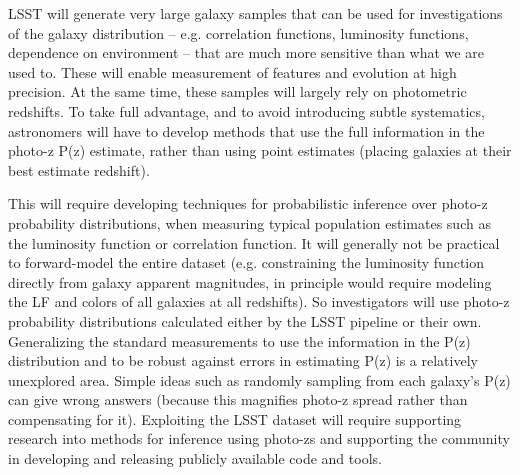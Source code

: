 
LSST will generate very large galaxy samples that can be used for
investigations of the galaxy distribution -- e.g. correlation
functions, luminosity functions, dependence on environment -- that are
much more sensitive than what we are used to. These will enable
measurement of features and evolution at high precision. At the same
time, these samples will largely rely on photometric redshifts. To
take full advantage, and to avoid introducing subtle systematics,
astronomers will have to develop methods that use the full information
in the photo-z P(z) estimate, rather than using point estimates
(placing galaxies at their best estimate redshift).

This will require developing techniques for probabilistic inference
over photo-z probability distributions, when measuring typical
population estimates such as the luminosity function or correlation
function. It will generally not be practical to forward-model the
entire dataset (e.g. constraining the luminosity function directly
from galaxy apparent magnitudes, in principle would require modeling
the LF and colors of all galaxies at all redshifts). So investigators
will use photo-z probability distributions calculated either by the
LSST pipeline or their own.  Generalizing the standard measurements to
use the information in the P(z) distribution and to be robust against
errors in estimating P(z) is a relatively unexplored area. Simple
ideas such as randomly sampling from each galaxy's P(z) can give wrong
answers (because this magnifies photo-z spread rather than
compensating for it). Exploiting the LSST dataset will require
supporting research into methods for inference using photo-zs and
supporting the community in developing and releasing publicly
available code and tools.
